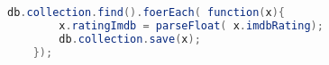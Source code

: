 \begin{lstlisting}[language=Java,  basicstyle=\footnotesize]
	db.collection.find().foerEach( function(x){
		x.ratingImdb = parseFloat( x.imdbRating);
		db.collection.save(x);
	});
\end{lstlisting}